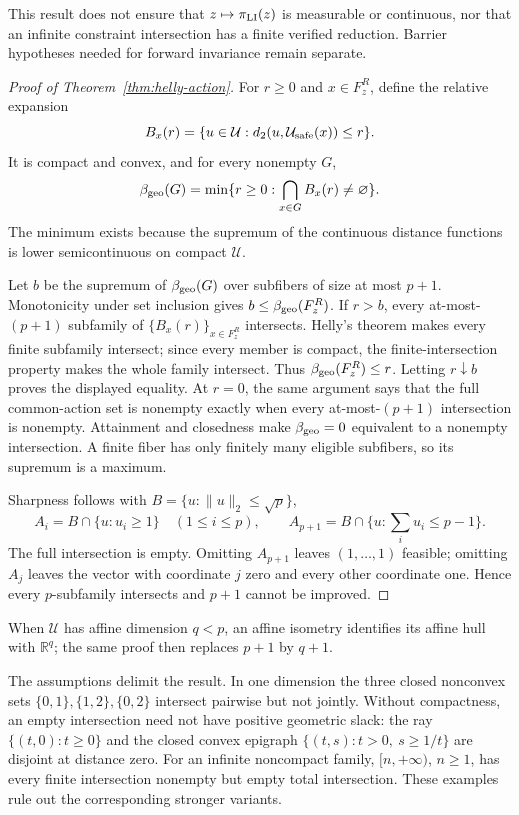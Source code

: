 This result does not ensure that $z\mapsto\pi_{\rm LI}(z)$ is measurable or continuous, nor that an
infinite constraint intersection has a finite verified reduction.  Barrier hypotheses needed for
forward invariance remain separate.

\begin{proof}[Proof of Theorem~\ref{thm:helly-action}]
For $r\geq0$ and $x\in F_z^R$, define the relative expansion
\[
 B_x(r)=\{u\in\mathcal U:d_2(u,\mathcal{U}_{\mathrm{safe}}(x))\leq r\}.
\]
It is compact and convex, and for every nonempty $G$,
\[
 \beta_{\rm geo}(G)=\min\{r\geq0:\bigcap_{x\in G}B_x(r)\neq\varnothing\}.
\]
The minimum exists because the supremum of the continuous distance functions is lower
semicontinuous on compact $\mathcal U$.

Let $b$ be the supremum of $\beta_{\rm geo}(G)$ over subfibers of size at most $p+1$.
Monotonicity under set inclusion gives $b\leq\beta_{\rm geo}(F_z^R)$.  If $r>b$, every at-most-
$(p+1)$ subfamily of $\{B_x(r)\}_{x\in F_z^R}$ intersects.  Helly's theorem makes every finite
subfamily intersect; since every member is compact, the finite-intersection property makes the
whole family intersect.  Thus $\beta_{\rm geo}(F_z^R)\leq r$.  Letting $r\downarrow b$ proves the
displayed equality.  At $r=0$, the same argument says that the full common-action set is nonempty
exactly when every at-most-$(p+1)$ intersection is nonempty.  Attainment and closedness make
$\beta_{\rm geo}=0$ equivalent to a nonempty intersection.  A finite fiber has only finitely many
eligible subfibers, so its supremum is a maximum.

Sharpness follows with $B=\{u:\|u\|_2\leq\sqrt p\}$,
\[
 A_i=B\cap\{u:u_i\geq1\}\quad(1\leq i\leq p),\qquad
 A_{p+1}=B\cap\{u:\textstyle\sum_i u_i\leq p-1\}.
\]
The full intersection is empty.  Omitting $A_{p+1}$ leaves $(1,\ldots,1)$ feasible; omitting
$A_j$ leaves the vector with coordinate $j$ zero and every other coordinate one.  Hence every
$p$-subfamily intersects and $p+1$ cannot be improved.
\end{proof}

When $\mathcal U$ has affine dimension $q<p$, an affine isometry identifies its affine hull with
$\mathbb R^q$; the same proof then replaces $p+1$ by $q+1$.

The assumptions delimit the result.  In one dimension the three closed nonconvex sets
$\{0,1\},\{1,2\},\{0,2\}$ intersect pairwise but not jointly.  Without compactness, an empty
intersection need not have positive geometric slack: the ray $\{(t,0):t\geq0\}$ and the closed
convex epigraph $\{(t,s):t>0,\ s\geq1/t\}$ are disjoint at distance zero.  For an infinite
noncompact family, $[n,+\infty)$, $n\geq1$, has every finite intersection nonempty but empty total
intersection.  These examples rule out the corresponding stronger variants.

